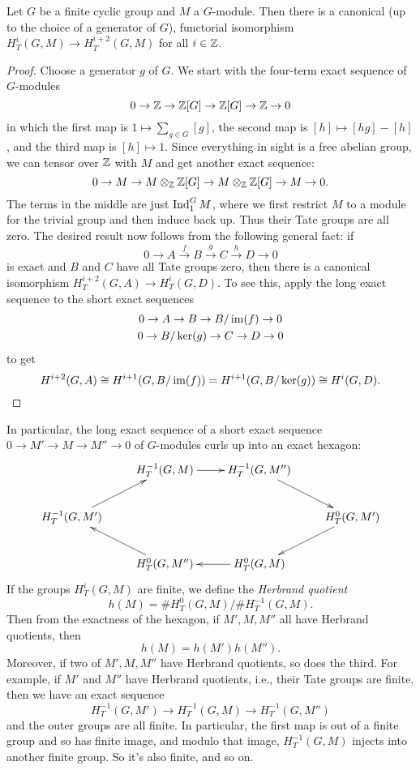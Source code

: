 \begin{theorem} \label{T:cyclic group periodicity}
Let $G$ be a finite cyclic group and $M$ a $G$-module. Then there is
a canonical (up to the choice of a generator of $G$), functorial isomorphism $H^i_T(G,M) \to H^{i+2}_T(G,M)$ for all
$i \in \mathbb{Z}$.
\end{theorem}
\begin{proof}
Choose a generator $g$ of $G$.
We start with the four-term exact sequence of $G$-modules
\[
0 \to \mathbb{Z} \to \mathbb{Z}[G] \to \mathbb{Z}[G] \to \mathbb{Z} \to 0
\]
in which the first map is $1 \mapsto \sum_{g \in G} [g]$, the second map is
$[h] \mapsto [hg] - [h]$, and the third map is $[h] \mapsto 1$.
Since everything in sight is a free abelian group, we can tensor over $\mathbb{Z}$
with $M$ and get another exact sequence:
\[
0 \to M \to M \otimes_{\mathbb{Z}} \mathbb{Z}[G] \to M \otimes_{\mathbb{Z}} \mathbb{Z}[G] \to M \to 0.
\]
The terms in the middle are just $\operatorname{Ind}^G_{1} M$, where we first
restrict $M$ to a module for the trivial group and then induce back up.
Thus their Tate groups are all zero. The desired result now
follows from the following general fact: if
\[
0 \to A \stackrel{f}{\to} B \stackrel{g}{\to} C \stackrel{h}{\to} D \to 0
\]
is exact and $B$ and $C$ have all Tate groups zero, then
there is a canonical isomorphism $H^{i+2}_T(G, A) \to H^i_T(G, D)$.
To see this, apply the long exact sequence to the short exact sequences
\begin{gather*}
0 \to A \to B \to B/\operatorname{im}(f) \to 0 \\
0 \to B/\ker(g) \to C \to D \to 0
\end{gather*}
to get
\[
H^{i+2}(G, A) \cong H^{i+1}(G, B/\operatorname{im}(f)) = H^{i+1}(G, B/\ker(g))
\cong H^i(G,D).
\]
\end{proof}
In particular, the long exact sequence of a short exact sequence
$0 \to M' \to M \to M'' \to 0$ of $G$-modules curls up into an exact hexagon:
\[
\xymatrix{
 & H^{-1}_T(G, M) \ar[r] & H^{-1}_T(G, M'') \ar[dr] & \\
H^{-1}_T(G, M') \ar[ru] & & & H^0_T(G, M') \ar[dl] \\
 & H^{0}_T(G, M'') \ar[lu] & H^{0}_T(G, M) \ar[l] &
}
\]
If the groups $H^i_T(G, M)$ are finite, we define the
\emph{Herbrand quotient} 
\[
h(M) = \#H^0_T(G,M) / \#H^{-1}_T(G, M).
\]
Then from the exactness of the hexagon, if $M', M, M''$ all have
Herbrand quotients, then
\[
h(M) = h(M') h(M'').
\]
Moreover, if two of $M', M, M''$ have Herbrand quotients, so does the third.
For example, if $M'$ and $M''$ have Herbrand quotients, i.e., their Tate
groups are finite, then we have an exact sequence
\[
H^{-1}_T(G, M') \to H^{-1}_T(G, M)
\to H^{-1}_T(G, M'')
\]
and the outer groups are all finite. In particular, the first map is out
of a finite group and so has finite image, and modulo that image,
$H^{-1}_T(G,M)$ injects into another finite group. So it's also finite,
and so on.


